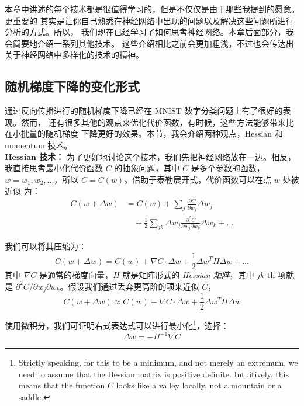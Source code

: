 本章中讲述的每个技术都是很值得学习的，但是不仅仅是由于那些我提到的愿意。更重要的
其实是让你自己熟悉在神经网络中出现的问题以及解决这些问题所进行分析的方式。所以，
我们现在已经学习了如何思考神经网络。本章后面部分，我会简要地介绍一系列其他技术。
这些介绍相比之前会更加粗浅，不过也会传达出关于神经网络中多样化的技术的精神。

\subsection{随机梯度下降的变化形式}

通过反向传播进行的随机梯度下降已经在 MNIST 数字分类问题上有了很好的表现。然而，
还有很多其他的观点来优化代价函数，有时候，这些方法能够带来比在小批量的随机梯度
下降更好的效果。本节，我会介绍两种观点，Hessian 和 momentum 技术。
\\

\textbf{Hessian 技术：} 为了更好地讨论这个技术，我们先把神经网络放在一边。相反，
我直接思考最小化代价函数 $C$ 的抽象问题，其中 $C$ 是多个参数的函数，
$w=w_1,w_2,...$，所以 $C=C(w)$。借助于泰勒展开式，代价函数可以在点 $w$ 处被近似
为：
\begin{align}
  C(w+\Delta w) &= C(w) + \sum_j \frac{\partial C}{\partial w_j} \Delta w_j \nonumber \\
     & \quad + \frac{1}{2} \sum_{jk} \Delta w_j \frac{\partial^2 C}{\partial w_j \partial w_k} \Delta w_k + \ldots \label{eq:103}\tag{103}
\end{align}

我们可以将其压缩为：
\begin{equation}
  C(w+\Delta w) = C(w) + \nabla C \cdot \Delta w +
  \frac{1}{2} \Delta w^T H \Delta w + \ldots
  \label{eq:104}\tag{104}
\end{equation}
其中 $\nabla C$ 是通常的梯度向量，$H$ 就是矩阵形式的 \emph{Hessian 矩阵}，其中 $jk$-th
项就是 $\partial^2 C/\partial w_j\partial w_k$。假设我们通过丢弃更高阶的项来近似
$C$，
\begin{equation} 
  C(w+\Delta w) \approx C(w) + \nabla C \cdot \Delta w +
  \frac{1}{2} \Delta w^T H \Delta w
  \label{eq:105}\tag{105}
\end{equation}

使用微积分，我们可证明右式表达式可以进行最小化\footnote{Strictly speaking, for
  this to be a minimum, and not merely an extremum, we need to assume that the
  Hessian matrix is positive definite. Intuitively, this means that the function
  $C$ looks like a valley locally, not a mountain or a saddle.}，选择：
\begin{equation}
  \Delta w = -H^{-1} \nabla C
  \label{eq:106}\tag{106}
\end{equation}

